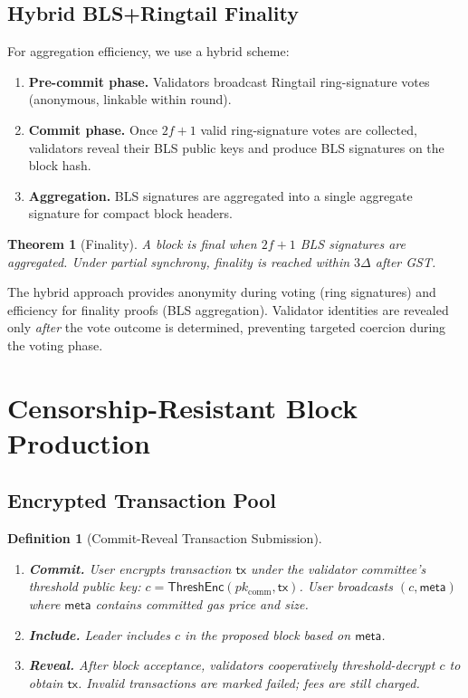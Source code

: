 \documentclass[11pt,a4paper]{article}
\newtheorem{definition}{Definition}[section]
\newtheorem{theorem}{Theorem}[section]
\begin{document}
\subsection{Hybrid BLS+Ringtail Finality}

For aggregation efficiency, we use a hybrid scheme:

\begin{enumerate}
    \item \textbf{Pre-commit phase.}  Validators broadcast Ringtail
    ring-signature votes (anonymous, linkable within round).
    \item \textbf{Commit phase.}  Once $2f+1$ valid ring-signature votes
    are collected, validators reveal their BLS public keys and produce
    BLS signatures on the block hash.
    \item \textbf{Aggregation.}  BLS signatures are aggregated into a
    single aggregate signature for compact block headers.
\end{enumerate}

\begin{theorem}[Finality]
    A block is final when $2f+1$ BLS signatures are aggregated.  Under
    partial synchrony, finality is reached within $3\Delta$ after GST.
\end{theorem}

The hybrid approach provides anonymity during voting (ring signatures)
and efficiency for finality proofs (BLS aggregation).  Validator
identities are revealed only \emph{after} the vote outcome is determined,
preventing targeted coercion during the voting phase.

\section{Censorship-Resistant Block Production}
\label{sec:censorship}

\subsection{Encrypted Transaction Pool}

\begin{definition}[Commit-Reveal Transaction Submission]
    \begin{enumerate}[label=(\roman*)]
        \item \textbf{Commit.}  User encrypts transaction $\mathsf{tx}$
        under the validator committee's threshold public key:
        $c = \mathsf{ThreshEnc}(pk_{\mathrm{comm}}, \mathsf{tx})$.
        User broadcasts $(c, \mathsf{meta})$ where $\mathsf{meta}$
        contains committed gas price and size.
        \item \textbf{Include.}  Leader includes $c$ in the proposed
        block based on $\mathsf{meta}$.
        \item \textbf{Reveal.}  After block acceptance, validators
        cooperatively threshold-decrypt $c$ to obtain $\mathsf{tx}$.
        Invalid transactions are marked failed; fees are still charged.
    \end{enumerate}
\end{definition}
\end{document}
